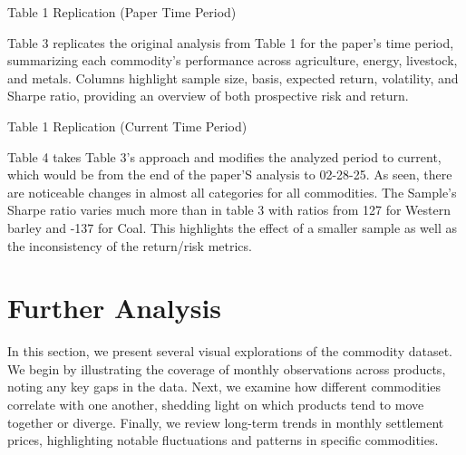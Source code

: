 \documentclass[12pt]{article}
\begin{document}
\begin{table}[ht!]
    \caption{Table 1 Replication (Paper Time Period)}
    \centering
    \begin{adjustbox}{max width=\textwidth}
    
    \end{adjustbox}
    \caption*{
      Table 3 replicates the original analysis from Table 1 for the paper's time period, 
      summarizing each commodity’s performance across agriculture, energy, livestock, and metals. 
      Columns highlight sample size, basis, expected return, volatility, and Sharpe ratio, providing 
      an overview of both prospective risk and return.
    }
    \label{table:paper_table1_replication_paper}
\end{table}

\begin{table}[ht!]
  \caption{Table 1 Replication (Current Time Period)}
  \centering
  \begin{adjustbox}{max width=\textwidth}
  
  \end{adjustbox}
  \caption*{
    Table 4 takes Table 3's approach and modifies the analyzed period to current, which would be from the end of the paper'S
    analysis to 02-28-25. As seen, there are noticeable changes in almost all categories for all commodities. The Sample's Sharpe ratio
    varies much more than in table 3 with ratios from 127 for Western barley and -137 for Coal. This highlights the effect of a smaller sample
    as well as the inconsistency of the return/risk metrics.
  }
  \label{table:paper_table1_replication_current}
\end{table}

\newpage
\section{Further Analysis}
In this section, we present several visual explorations of the commodity dataset. We begin by illustrating 
the coverage of monthly observations across products, noting any key gaps in the data. Next, we examine 
how different commodities correlate with one another, shedding light on which products tend to move together 
or diverge. Finally, we review long-term trends in monthly settlement prices, highlighting notable fluctuations and 
patterns in specific commodities. 
\end{document}
